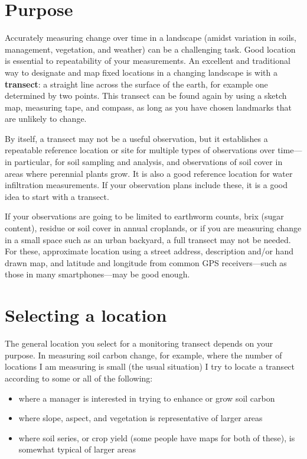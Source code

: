\documentclass[11pt,letterpaper,twoside,onecolumn]{memoir}
\begin{document}
\section*{Purpose}

Accurately measuring change over time in a landscape (amidst variation in soils, management, vegetation, and weather) can be a challenging task. Good location is essential to repeatability of your measurements. An excellent and traditional way to designate and map fixed locations in a changing landscape is with a \textbf{transect}: a straight line across the surface of the earth, for example one determined by two points. This transect can be found again by using a sketch map, measuring tape, and compass, as long as you have chosen landmarks that are unlikely to change. 

By itself, a transect may not be a useful observation, but it establishes a repeatable reference location or site for multiple types of observations over time---in particular, for soil sampling and analysis, and observations of soil cover in areas where perennial plants grow. It is also a good reference location for water infiltration measurements. If your observation plans include these, it is a good idea to start with a transect.

If your observations are going to be limited to earthworm counts, brix (sugar content), residue or soil cover in annual croplands, or if you are measuring change in a small space such as an urban backyard, a full transect may not be needed. For these, approximate location using a street address, description and/or hand drawn map, and latitude and longitude from common GPS receivers---such as those in many smartphones---may be good enough.

\section*{Selecting a location}

The general location you select for a monitoring transect depends on your purpose. In measuring soil carbon change, for example, where the number of locations I am measuring is small (the usual situation) I try to locate a transect according to some or all of the following:

\begin{itemize}
\item[] where a manager is interested in trying to enhance or grow soil carbon
\item[] where slope, aspect, and vegetation is representative of larger areas
\item[] where soil series, or crop yield (some people have maps for both of these), is somewhat typical of larger areas
\end{itemize}
\end{document}
